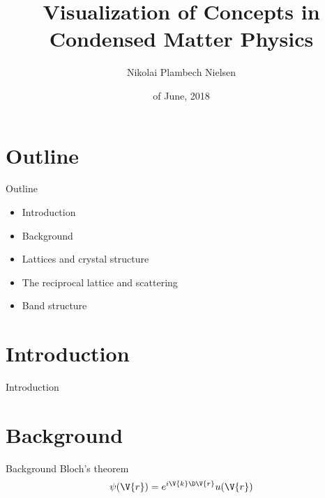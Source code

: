 \documentclass{beamer}
\title[Bachelors Thesis]{Visualization of Concepts in Condensed Matter Physics}
\author{Nikolai Plambech Nielsen}
\institute{Niels Bohr Institute}
\date{\nth{27} of June, 2018}
\begin{document}
\begin{frame}
  \titlepage
\end{frame}


\section{Outline}
\begin{frame}{Outline}
\begin{itemize}
  \item Introduction
  \item Background
  \item Lattices and crystal structure
  \item The reciprocal lattice and scattering
  \item Band structure
\end{itemize}
\end{frame}



\section{Introduction}
\begin{frame}{Introduction}
\end{frame}


\section{Background}
\begin{frame}{Background}
Bloch's theorem
\begin{equation}
	\psi(\V{r}) = e^{i \V{k}\D \V{r}} u(\V{r})
\end{equation}
\end{frame}
\end{document}
